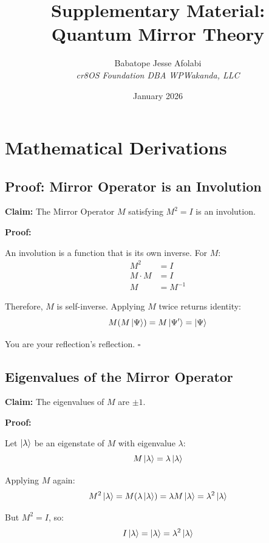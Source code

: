 \documentclass[12pt,a4paper]{article}
\title{Supplementary Material:\\Quantum Mirror Theory}
\author{Babatope Jesse Afolabi\\
\textit{cr8OS Foundation DBA WPWakanda, LLC}}
\date{January 2026}
\begin{document}
\maketitle

\section{Mathematical Derivations}

\subsection{Proof: Mirror Operator is an Involution}

\textbf{Claim:} The Mirror Operator $M$ satisfying $M^2 = I$ is an involution.

\textbf{Proof:}

An involution is a function that is its own inverse. For $M$:
\begin{align}
M^2 &= I \\
M \cdot M &= I \\
M &= M^{-1}
\end{align}

Therefore, $M$ is self-inverse. Applying $M$ twice returns identity:
\begin{equation}
M(M\ket{\Psi}) = M\ket{\Psi'} = \ket{\Psi}
\end{equation}

You are your reflection's reflection. $\square$

\subsection{Eigenvalues of the Mirror Operator}

\textbf{Claim:} The eigenvalues of $M$ are $\pm 1$.

\textbf{Proof:}

Let $\ket{\lambda}$ be an eigenstate of $M$ with eigenvalue $\lambda$:
\begin{equation}
M\ket{\lambda} = \lambda\ket{\lambda}
\end{equation}

Applying $M$ again:
\begin{equation}
M^2\ket{\lambda} = M(\lambda\ket{\lambda}) = \lambda M\ket{\lambda} = \lambda^2\ket{\lambda}
\end{equation}

But $M^2 = I$, so:
\begin{equation}
I\ket{\lambda} = \ket{\lambda} = \lambda^2\ket{\lambda}
\end{equation}
\end{document}
